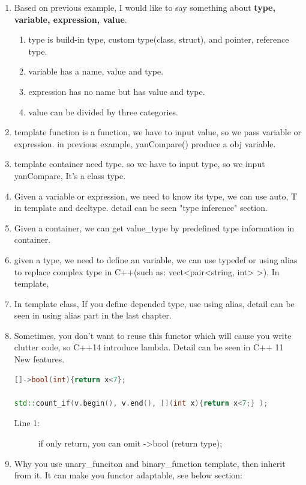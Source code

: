 \documentclass[a4paper,11pt,twoside]{book}
\begin{document}
\begin{enumerate}
\item Based on previous example, I would like to say something about \textbf{type, variable, expression, value}.
\begin{enumerate}
\item type is build-in type, custom type(class, struct), and pointer, reference type.
\item variable has a name, value and type.
\item expression has no name but has value and type.
\item value can be divided by three categories.
\end{enumerate}
\item template function is a function, we have to input value, so we pass variable or expression. in previous example, yanCompare() produce a obj variable.
\item template container need type. so we have to input type, so we input yanCompare, It's a class type.
\item Given a variable or expression, we need to know its type, we can use auto, T in template and decltype. detail can be seen "type inference" section.
\item Given a container, we can get value\_type by predefined type information in container.

\item given a type, we need to define an variable, we can use typedef or using alias to replace complex type in C++(such as: vect<pair<string, int> >). In template,
\item In template class, If you define depended type, use using alias, detail can be seen in using alias part in the last chapter.

\item Sometimes, you don't want to reuse this functor which will cause you write clutter code, so C++14 introduce lambda.  Detail can be seen in C++ 11 New features.
\begin{lstlisting}[frame=single, language=c++]
 []->bool(int){return x<7};

std::count_if(v.begin(), v.end(), [](int x){return x<7;} );
\end{lstlisting}
\begin{description}
	\item[Line 1:]  if only return, you can omit ->bool (return type);
\end{description}

\item Why you use  unary\_funciton and binary\_function template, then inherit from it.  It can make you functor adaptable, see below section:
\end{enumerate}
\end{document}
